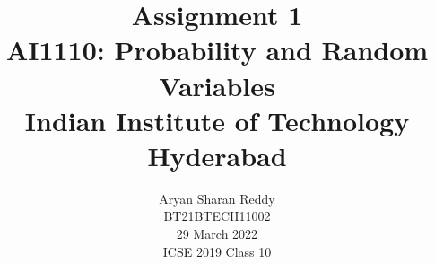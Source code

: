 \documentclass[journal,12pt,twocolumn]{IEEEtran}
\title{Assignment 1 \\ \Large AI1110: Probability and Random Variables \\ \large Indian Institute of Technology Hyderabad}
\author{Aryan Sharan Reddy \\ \normalsize BT21BTECH11002 \\ \vspace*{20pt} \normalsize  29 March 2022 \\ \vspace*{20pt} \Large ICSE 2019 Class 10}
\begin{document}
%


\newtheorem{theorem}{Theorem}[section]
\newtheorem{problem}{Problem}
\newtheorem{proposition}{Proposition}[section]
\newtheorem{lemma}{Lemma}[section]
\newtheorem{corollary}[theorem]{Corollary}
\newtheorem{example}{Example}[section]
\newtheorem{definition}[problem]{Definition}
\newcommand{\BEQA}{\begin{eqnarray}}
\newcommand{\EEQA}{\end{eqnarray}}
\newcommand{\define}{\stackrel{\triangle}{=}}
\newcommand*\circled[1]{\tikz[baseline=(char.base)]{
    \node[shape=circle,draw,inner sep=2pt] (char) {#1};}}

%
\providecommand{\mbf}{\mathbf}
\providecommand{\pr}[1]{\ensuremath{\Pr\left(#1\right)}}
\providecommand{\qfunc}[1]{\ensuremath{Q\left(#1\right)}}
\providecommand{\sbrak}[1]{\ensuremath{{}\left[#1\right]}}
\providecommand{\lsbrak}[1]{\ensuremath{{}\left[#1\right.}}
\providecommand{\rsbrak}[1]{\ensuremath{{}\left.#1\right]}}
\providecommand{\brak}[1]{\ensuremath{\left(#1\right)}}
\providecommand{\lbrak}[1]{\ensuremath{\left(#1\right.}}
\providecommand{\rbrak}[1]{\ensuremath{\left.#1\right)}}
\providecommand{\cbrak}[1]{\ensuremath{\left\{#1\right\}}}
\providecommand{\lcbrak}[1]{\ensuremath{\left\{#1\right.}}
\providecommand{\rcbrak}[1]{\ensuremath{\left.#1\right\}}}
\theoremstyle{remark}
\newtheorem{rem}{Remark}
\newcommand{\sgn}{\mathop{\mathrm{sgn}}}
\providecommand{\fourier}{\overset{\mathcal{F}}{ \rightleftharpoons}}
\providecommand{\system}{\overset{\mathcal{H}}{ \longleftrightarrow}}
\newcommand{\solution}{\noindent \textbf{Solution: }}
\newcommand{\cosec}{\,\text{cosec}\,}
\providecommand{\dec}[2]{\ensuremath{\overset{#1}{\underset{#2}{\gtrless}}}}
\newcommand{\myvec}[1]{\ensuremath{\begin{pmatrix}#1\end{pmatrix}}}
\newcommand{\mydet}[1]{\ensuremath{\begin{vmatrix}#1\end{vmatrix}}}
\makeatletter
{}
\makeatother
\let\StandardTheFigure\thefigure
\end{document}
